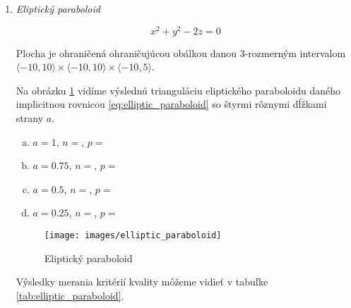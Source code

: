 \begin{enumerate}

\newpage
\item{
    \textit{Eliptický paraboloid}

    \begin{equation}
    \label{eq:elliptic_paraboloid}
        x^2+y^2-2z = 0
    \end{equation}

    Plocha je ohraničená ohraničujúcou obálkou danou $3$-rozmerným intervalom 
    \newline
    \mbox{$\langle -10, 10 \rangle \times \langle -10, 10 \rangle \times \langle -10, 5 \rangle$}.

    Na obrázku \ref{obr:elliptic_paraboloid} vidíme výslednú trianguláciu eliptického paraboloidu
    daného implicitnou rovnicou \ref{eq:elliptic_paraboloid} so štyrmi rôznymi dĺžkami strany $a$.
    \begin{enumerate}[a)]
    \item{
        $a=1$, $n=$, $p=$
    }
    \item{
        $a=0.75$, $n=$, $p=$
    }
    \item{
        $a=0.5$, $n=$, $p=$
    }
    \item{
        $a=0.25$, $n=$, $p=$
    }
    \end{enumerate}

    \begin{figure}
        \centerline{\texttt{[image: images/elliptic\_paraboloid]}}
        \caption[Eliptický paraboloid]{Eliptický paraboloid}
        \label{obr:elliptic_paraboloid}
    \end{figure}

    Výsledky merania kritérií kvality môžeme vidieť v tabuľke \ref{tab:elliptic_paraboloid}.

}
\end{enumerate}
